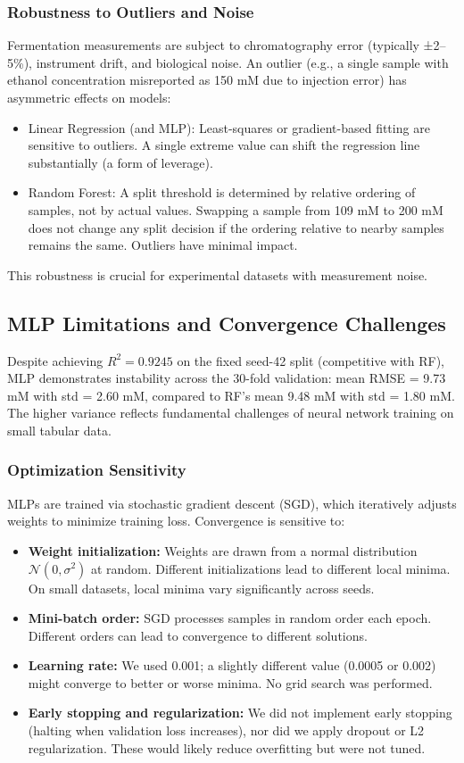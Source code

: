 \documentclass[conference]{IEEEtran}
\begin{document}
\subsubsection{Robustness to Outliers and Noise}
Fermentation measurements are subject to chromatography error (typically ±2–5\%), instrument drift, and biological noise. An outlier (e.g., a single sample with ethanol concentration misreported as 150 mM due to injection error) has asymmetric effects on models:
\begin{itemize}
\item Linear Regression (and MLP): Least-squares or gradient-based fitting are sensitive to outliers. A single extreme value can shift the regression line substantially (a form of leverage).
\item Random Forest: A split threshold is determined by relative ordering of samples, not by actual values. Swapping a sample from 109 mM to 200 mM does not change any split decision if the ordering relative to nearby samples remains the same. Outliers have minimal impact.
\end{itemize}

This robustness is crucial for experimental datasets with measurement noise.

\subsection{MLP Limitations and Convergence Challenges}
Despite achieving $R^2 = 0.9245$ on the fixed seed-42 split (competitive with RF), MLP demonstrates instability across the 30-fold validation: mean RMSE = 9.73 mM with std = 2.60 mM, compared to RF's mean 9.48 mM with std = 1.80 mM. The higher variance reflects fundamental challenges of neural network training on small tabular data.

\subsubsection{Optimization Sensitivity}
MLPs are trained via stochastic gradient descent (SGD), which iteratively adjusts weights to minimize training loss. Convergence is sensitive to:
\begin{itemize}
\item \textbf{Weight initialization:} Weights are drawn from a normal distribution $\mathcal{N}(0, \sigma^2)$ at random. Different initializations lead to different local minima. On small datasets, local minima vary significantly across seeds.
\item \textbf{Mini-batch order:} SGD processes samples in random order each epoch. Different orders can lead to convergence to different solutions.
\item \textbf{Learning rate:} We used 0.001; a slightly different value (0.0005 or 0.002) might converge to better or worse minima. No grid search was performed.
\item \textbf{Early stopping and regularization:} We did not implement early stopping (halting when validation loss increases), nor did we apply dropout or L2 regularization. These would likely reduce overfitting but were not tuned.
\end{itemize}
\end{document}
